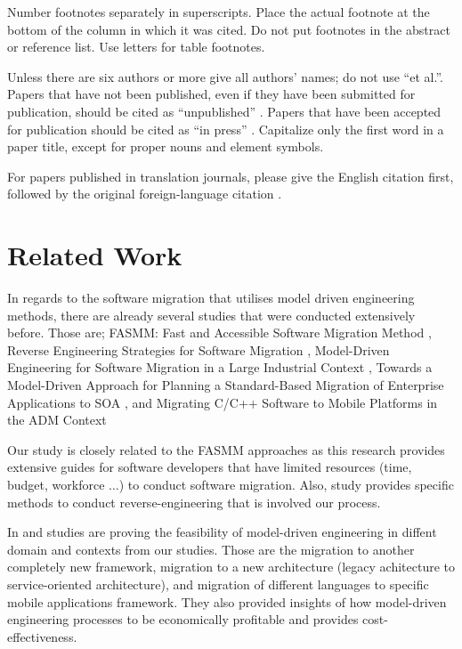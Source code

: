\documentclass[conference]{IEEEtran}
\begin{document}
Number footnotes separately in superscripts. Place the actual footnote at 
the bottom of the column in which it was cited. Do not put footnotes in the 
abstract or reference list. Use letters for table footnotes.

Unless there are six authors or more give all authors' names; do not use 
``et al.''. Papers that have not been published, even if they have been 
submitted for publication, should be cited as ``unpublished'' \cite{b4}. Papers 
that have been accepted for publication should be cited as ``in press'' \cite{b5}. 
Capitalize only the first word in a paper title, except for proper nouns and 
element symbols.

For papers published in translation journals, please give the English 
citation first, followed by the original foreign-language citation \cite{b6}.

\section{Related Work}
In regards to the software migration that utilises model driven engineering methods,
there are already several studies that were conducted extensively before.
Those are; FASMM: 
Fast and Accessible Software Migration Method \cite{b2}, Reverse Engineering 
Strategies for Software Migration \cite{b6}, Model-Driven Engineering 
for Software Migration in a Large Industrial Context \cite{b3},  
Towards a Model-Driven Approach for Planning a 
Standard-Based Migration of Enterprise Applications to SOA  \cite{b5}, and
Migrating C/C++ Software to Mobile Platforms in the ADM Context \cite{b4}

Our study is closely related to the FASMM approaches \cite{b2} as this research
provides extensive guides for software developers that have limited 
resources (time, budget, workforce $\ldots$) to conduct software migration. 
Also, \cite{b6} study provides specific methods to conduct reverse-engineering 
that is involved our process.

In \cite{b3} and \cite{b5} studies are proving the feasibility of model-driven engineering
in diffent domain and contexts from our studies. Those are the migration to another completely new framework, 
migration to a new architecture (legacy achitecture to service-oriented architecture), and migration
of different languages to specific mobile applications framework. 
They also provided insights of how model-driven engineering processes to be economically
profitable and provides cost-effectiveness. 
\end{document}
